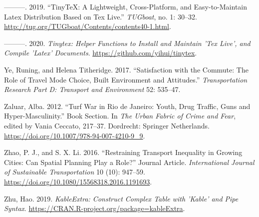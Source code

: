 \documentclass[]{elsarticle} %
\begin{document}
\leavevmode\hypertarget{ref-Xie2019tinytex}{}%
---------. 2019. ``TinyTeX: A Lightweight, Cross-Platform, and
Easy-to-Maintain Latex Distribution Based on Tex Live.'' \emph{TUGboat},
no. 1: 30--32. \url{http://tug.org/TUGboat/Contents/contents40-1.html}.

\leavevmode\hypertarget{ref-Xie2020tinytex}{}%
---------. 2020. \emph{Tinytex: Helper Functions to Install and Maintain
'Tex Live', and Compile 'Latex' Documents}.
\url{https://github.com/yihui/tinytex}.

\leavevmode\hypertarget{ref-ye2017satisfaction}{}%
Ye, Runing, and Helena Titheridge. 2017. ``Satisfaction with the
Commute: The Role of Travel Mode Choice, Built Environment and
Attitudes.'' \emph{Transportation Research Part D: Transport and
Environment} 52: 535--47.

\leavevmode\hypertarget{ref-Zaluar2012turf}{}%
Zaluar, Alba. 2012. ``Turf War in Rio de Janeiro: Youth, Drug Traffic,
Guns and Hyper-Masculinity.'' Book Section. In \emph{The Urban Fabric of
Crime and Fear}, edited by Vania Ceccato, 217--37. Dordrecht: Springer
Netherlands. \url{https://doi.org/10.1007/978-94-007-4210-9_9}.

\leavevmode\hypertarget{ref-Zhao2016restraining}{}%
Zhao, P. J., and S. X. Li. 2016. ``Restraining Transport Inequality in
Growing Cities: Can Spatial Planning Play a Role?'' Journal Article.
\emph{International Journal of Sustainable Transportation} 10 (10):
947--59. \url{https://doi.org/10.1080/15568318.2016.1191693}.

\leavevmode\hypertarget{ref-Zhu2019kableextra}{}%
Zhu, Hao. 2019. \emph{KableExtra: Construct Complex Table with 'Kable'
and Pipe Syntax}. \url{https://CRAN.R-project.org/package=kableExtra}.
\end{document}
